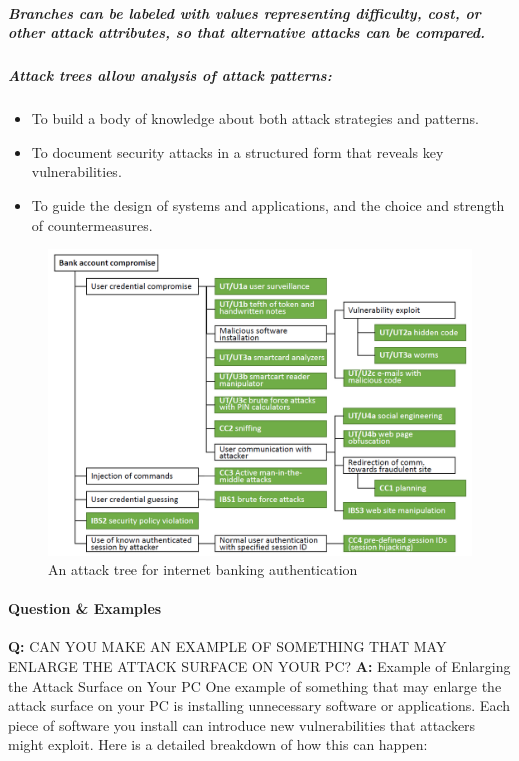 \documentclass{article}
\begin{document}
                \subparagraph{Branches can be labeled with values representing difficulty, cost, or other attack attributes, so that alternative attacks can be compared.}
                \subparagraph{Attack trees allow analysis of attack patterns:}
                    \begin{itemize}
                        \item To build a body of knowledge about both attack strategies and patterns.
                        \item To document security attacks in a structured form that reveals key vulnerabilities.
                        \item To guide the design of systems and applications, and the choice and strength of countermeasures.
                    \end{itemize}
                \begin{figure}
                    \begin{center}
                    \includegraphics[scale=0.5]{../immagini/Example_attack_tree.png}
                    \caption{An attack tree for internet banking authentication}
                    \end{center}
                \end{figure}


                \paragraph{Question \& Examples}
                    \textbf{Q:} CAN YOU MAKE AN EXAMPLE OF SOMETHING THAT MAY ENLARGE THE
                    ATTACK SURFACE ON YOUR PC?
                    \textbf{A:}
                    Example of Enlarging the Attack Surface on Your PC
                    One example of something that may enlarge the attack surface on your PC is installing unnecessary software or applications. Each piece of software you install can introduce new vulnerabilities that attackers might exploit. Here is a detailed breakdown of how this can happen:
\end{document}
